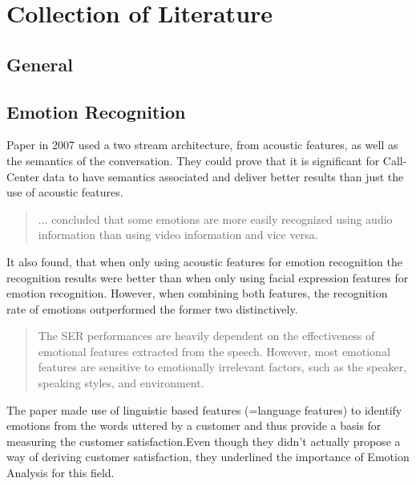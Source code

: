 \documentclass[11pt,a4paper]{scrbook}
\begin{document}
\chapter{Collection of Literature}
\section{General}

\section{Emotion Recognition}
Paper in 2007 used a two stream architecture, from acoustic features, as well as the semantics of the conversation. They could prove that it is significant for Call-Center data to have semantics associated and deliver better results than just the use of acoustic features. \cite{Gupta:2007:Two-StreamER}

\begin{quote}
... concluded that some emotions are more easily
recognized using audio information than using video information
and vice versa. \cite{Ayadi:2010:SurveyOnSER}
\end{quote} 

It also found, that when only using acoustic features for emotion recognition the recognition results were better than when only using facial expression features for emotion recognition. However, when combining both features, the recognition rate of emotions outperformed the former two distinctively. \cite{Ayadi:2010:SurveyOnSER}
\newline\newline
\begin{quote}
    The SER performances are heavily dependent on the effectiveness of emotional features extracted from the speech. However, most emotional features are sensitive to emotionally irrelevant factors, such as the speaker, speaking styles, and environment. \cite{Chen:2018:3DConvRecurrentNN}
\end{quote}

The paper made use of linguistic based features (=language features) to identify emotions from the words uttered by a customer and thus provide a basis for measuring the customer satisfaction.\newline Even though they didn't actually propose a way of deriving customer satisfaction, they underlined the importance of Emotion Analysis for this field. \cite{Ren:2012:Linguistic-basedEmotionAnalysis}
\end{document}
